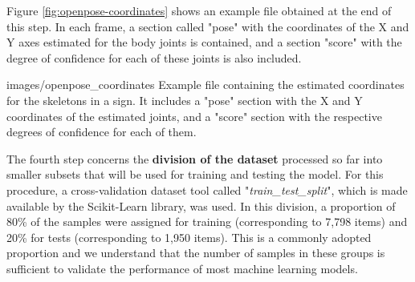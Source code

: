 Figure \ref{fig:openpose-coordinates} shows an example file obtained at the end of this step. In each frame, a section called "pose" with the coordinates of the X and Y axes estimated for  the body joints is contained, and a section "score" with the degree of confidence for each of these joints is also included.


    {images/openpose_coordinates}
    {Example file containing the estimated coordinates for the skeletons in a sign. It includes a "pose" section with the X and Y coordinates of the estimated joints, and a "score" section with the respective degrees of confidence for each of them.}

The fourth step concerns the \textbf{division of the dataset} processed so far into smaller subsets that will be used for training and testing the model. For this procedure, a cross-validation dataset tool called "\textit{train\_test\_split}", which is made available by the Scikit-Learn \cite{scikit-learn} library, was used. In this division, a proportion of 80\% of the samples were assigned for training (corresponding to 7,798 items) and 20\% for tests (corresponding to 1,950 items). This is a commonly adopted proportion and we understand that the number of samples in these groups is sufficient to validate the performance of most machine learning models.


